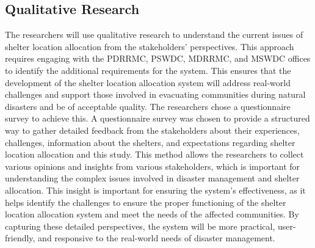 \subsection{Qualitative Research}

The researchers will use qualitative research to understand the current issues of shelter location allocation from the stakeholders' perspectives. This approach requires engaging with the PDRRMC, PSWDC, MDRRMC, and MSWDC offices to identify the additional requirements for the system. This ensures that the development of the shelter location allocation system will address real-world challenges and support those involved in evacuating communities during natural disasters and be of acceptable quality.
The researchers chose a questionnaire survey to achieve this. A questionnaire survey was chosen to provide a structured way to gather detailed feedback from the stakeholders about their experiences, challenges, information about the shelters, and expectations regarding shelter location allocation and this study. This method allows the researchers to collect various opinions and insights from various stakeholders, which is important for understanding the complex issues involved in disaster management and shelter allocation.
This insight is important for ensuring the system's effectiveness, as it helps identify the challenges to ensure the proper functioning of the shelter location allocation system and meet the needs of the affected communities. By capturing these detailed perspectives, the system will be more practical, user-friendly, and responsive to the real-world needs of disaster management.
